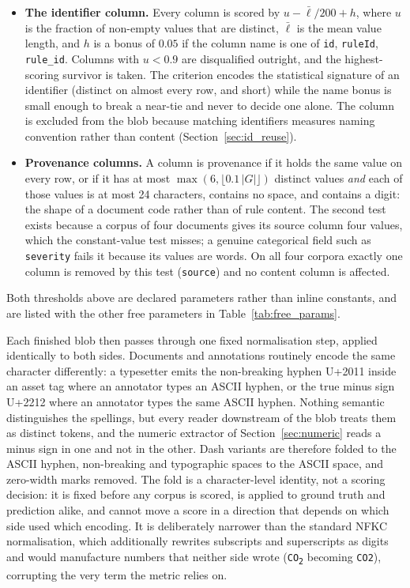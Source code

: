 \documentclass[11pt]{article}
\begin{document}
\begin{itemize}
    \item \textbf{The identifier column.} Every column is scored by
          $u - \bar{\ell}/200 + h$, where $u$ is the fraction of non-empty values
          that are distinct, $\bar{\ell}$ is the mean value length, and $h$ is a
          bonus of $0.05$ if the column name is one of \texttt{id},
          \texttt{ruleId}, \texttt{rule\_id}. Columns with $u < 0.9$ are
          disqualified outright, and the highest-scoring survivor is taken. The
          criterion encodes the statistical signature of an identifier (distinct on almost every row, and short) while the name bonus is
          small enough to break a near-tie and never to decide one alone. The
          column is excluded from the blob because matching identifiers measures
          naming convention rather than content
          (Section~\ref{sec:id_reuse}).
    \item \textbf{Provenance columns.} A column is provenance if it holds the
          same value on every row, or if it has at most
          $\max(6, \lfloor 0.1\,|G| \rfloor)$ distinct values \emph{and} each of
          those values is at most 24 characters, contains no space, and contains
          a digit: the shape of a document code rather than of rule content.
          The second test exists because a corpus of four documents gives its
          source column four values, which the constant-value test misses; a
          genuine categorical field such as \texttt{severity} fails it because
          its values are words. On all four corpora exactly one column is
          removed by this test (\texttt{source}) and no content column is
          affected.
\end{itemize}

Both thresholds above are declared parameters rather than inline constants, and
are listed with the other free parameters in Table~\ref{tab:free_params}.

Each finished blob then passes through one fixed normalisation step, applied
identically to both sides. Documents and annotations routinely encode the same
character differently: a typesetter emits the non-breaking hyphen U+2011 inside
an asset tag where an annotator types an ASCII hyphen, or the true minus sign
U+2212 where an annotator types the same ASCII hyphen. Nothing semantic
distinguishes the spellings, but every reader downstream of the blob treats them
as distinct tokens, and the numeric extractor of
Section~\ref{sec:numeric} reads a minus sign in one and not in the other. Dash
variants are therefore folded to the ASCII hyphen, non-breaking and typographic
spaces to the ASCII space, and zero-width marks removed. The fold is a
character-level identity, not a scoring decision: it is fixed before any corpus
is scored, is applied to ground truth and prediction alike, and cannot move a
score in a direction that depends on which side used which encoding. It is
deliberately narrower than the standard NFKC normalisation, which additionally
rewrites subscripts and superscripts as digits and would manufacture numbers
that neither side wrote (\texttt{CO\textsubscript{2}} becoming
\texttt{CO2}), corrupting the very term the metric relies on.
\end{document}
